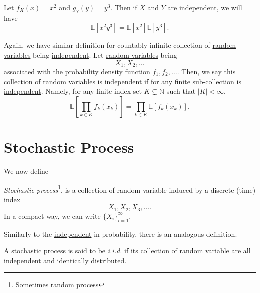 \begin{eg}
	Let \(f_X(x) = x^2\) and \(g_Y(y) = y^3\). Then if \(X\) and \(Y\) are \hyperref[def:independent]{independent}, we will have
	\[
		\mathbb{E}\left[x^2 y^3 \right] = \mathbb{E}\left[x^2 \right] \mathbb{E}\left[y^3 \right].
	\]
\end{eg}

\begin{remark}
	Again, we have similar definition for countably infinite collection of \hyperref[def:random-variable]{random variables} being \hyperref[def:independent]{independent}. Let \hyperref[def:random-variable]{random variables} being
	\[
		X_1, X_2, \dots
	\]
	associated with the probability density function \(f_1, f_2, \dots\). Then, we say this collection of \hyperref[def:random-variable]{random variables} is \hyperref[def:independent]{independent} if for any finite sub-collection is \hyperref[def:independent]{independent}. Namely, for any finite index set \(K\subsetneq\mathbb{N}\) such that \(\left\vert K \right\vert < \infty \),
	\[
		\mathbb{E}\left[\prod\limits_{k\in K} f_k(x_k) \right] = \prod\limits_{k\in K} \mathbb{E}\left[f_k(x_k) \right] .
	\]
\end{remark}

\section{Stochastic Process}
We now define
\begin{definition}\label{def:stochastic-process}
	\emph{Stochastic process}\footnote{Sometimes random process}, is a collection of \hyperref[def:random-variable]{random variable} induced by a discrete (time) index
	\[
		X_1, X_2, X_3, \dots.
	\]
	In a compact way, we can write \(\{X_i\}_{i = 1}^{\infty }\).
\end{definition}

Similarly to the \hyperref[def:independent]{independent} in probability, there is an analogous definition.

\begin{definition}[i.i.d.]\label{def:i.i.d.}
	A stochastic process is said to be \emph{i.i.d.} if its collection of \hyperref[def:random-variable]{random variable} are all \hyperref[def:independent]{independent} and identically distributed.
\end{definition}